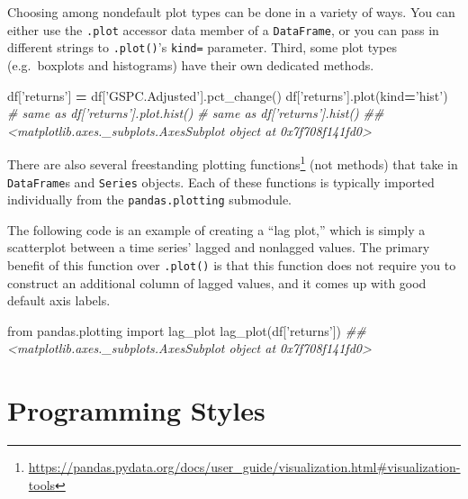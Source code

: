 \documentclass[12pt,krantz2]{krantz}
\makeatletter
\newenvironment{Shaded}{\begin{snugshade}}{\end{snugshade}}
\newcommand{\CommentTok}[1]{\textcolor[rgb]{0.37,0.37,0.37}{\textit{#1}}}
\newcommand{\ImportTok}[1]{#1}
\newcommand{\NormalTok}[1]{#1}
\newcommand{\OperatorTok}[1]{\textcolor[rgb]{0.43,0.43,0.43}{\textbf{#1}}}
\newcommand{\StringTok}[1]{\textcolor[rgb]{0.5,0.5,0.5}{#1}}
\renewcommand{\href}[2]{#2\footnote{\url{#1}}}
\newenvironment{kframe}{%
\medskip{}
\setlength{\fboxsep}{.8em}
 \def\at@end@of@kframe{}%
 \ifinner\ifhmode%
  \def\at@end@of@kframe{\end{minipage}}%
  \begin{minipage}{\columnwidth}%
 \fi\fi%
 \def\FrameCommand##1{\hskip\@totalleftmargin \hskip-\fboxsep
 \colorbox{shadecolor}{##1}\hskip-\fboxsep
     \hskip-\linewidth \hskip-\@totalleftmargin \hskip\columnwidth}%
 \MakeFramed {\advance\hsize-\width
   \@totalleftmargin\z@ \linewidth\hsize
   \@setminipage}}%
 {\par\unskip\endMakeFramed%
 \at@end@of@kframe}
\renewenvironment{Shaded}{\begin{kframe}}{\end{kframe}}
\makeatother
\begin{document}
Choosing among nondefault plot types can be done in a variety of ways. You can either use the \texttt{.plot} accessor data member of a \texttt{DataFrame}, or you can pass in different strings to \texttt{.plot()}'s \texttt{kind=} parameter. Third, some plot types (e.g.~boxplots and histograms) have their own dedicated methods.

\begin{Shaded}
\begin{Highlighting}[]
\NormalTok{df[}\StringTok{'returns'}\NormalTok{] }\OperatorTok{=}\NormalTok{ df[}\StringTok{'GSPC.Adjusted'}\NormalTok{].pct_change()}
\NormalTok{df[}\StringTok{'returns'}\NormalTok{].plot(kind}\OperatorTok{=}\StringTok{'hist'}\NormalTok{)}
\CommentTok{# same as df['returns'].plot.hist()}
\CommentTok{# same as df['returns'].hist()}
\CommentTok{## <matplotlib.axes._subplots.AxesSubplot object at 0x7f708f141fd0>}
\end{Highlighting}
\end{Shaded}

There are also \href{https://pandas.pydata.org/docs/user_guide/visualization.html\#visualization-tools}{several freestanding plotting functions} (not methods) that take in \texttt{DataFrame}s and \texttt{Series} objects. Each of these functions is typically imported individually from the \texttt{pandas.plotting} submodule.

The following code is an example of creating a ``lag plot,'' which is simply a scatterplot between a time series' lagged and nonlagged values. The primary benefit of this function over \texttt{.plot()} is that this function does not require you to construct an additional column of lagged values, and it comes up with good default axis labels.

\begin{Shaded}
\begin{Highlighting}[]
\ImportTok{from}\NormalTok{ pandas.plotting }\ImportTok{import}\NormalTok{ lag_plot}
\NormalTok{lag_plot(df[}\StringTok{'returns'}\NormalTok{])}
\CommentTok{## <matplotlib.axes._subplots.AxesSubplot object at 0x7f708f141fd0>}
\end{Highlighting}
\end{Shaded}

\hypertarget{part-programming-styles}{%
\part{Programming Styles}\label{part-programming-styles}}
\end{document}
